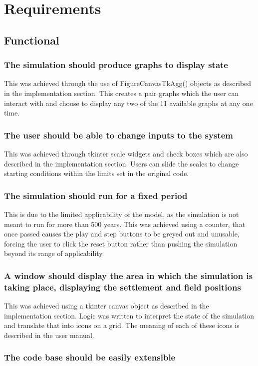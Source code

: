 \documentclass[12pt]{article}
\begin{document}
	\section{Requirements}
		\subsection{Functional}
			\subsubsection{The simulation should produce graphs to display state}
				This was achieved through the use of FigureCanvasTkAgg() objects as described in the implementation section. This creates a pair graphs which the user can interact with and choose to display any two of the 11 available graphs at any one time.
			\subsubsection{	The user should be able to change inputs to the system}
				This was achieved through tkinter scale widgets and check boxes which are also described in the implementation section. Users can slide the scales to change starting conditions within the limits set in the original code.
			\subsubsection{The simulation should run for a fixed period}
				This is due to the limited applicability of the model, as the simulation is not meant to run for more than 500 years. This was achieved using a counter, that once passed causes the play and step buttons to be greyed out and unusable, forcing the user to click the reset button rather than pushing the simulation beyond its range of applicability.
			\subsubsection{A window should display the area in which the simulation is taking place, displaying the settlement and field positions}
				This was achieved using a tkinter canvas object as described in the implementation section. Logic was written to interpret the state of the simulation and translate that into icons on a grid. The meaning of each of these icons is described in the user manual.
			\subsubsection{The code base should be easily extensible}
		 
\end{document}
